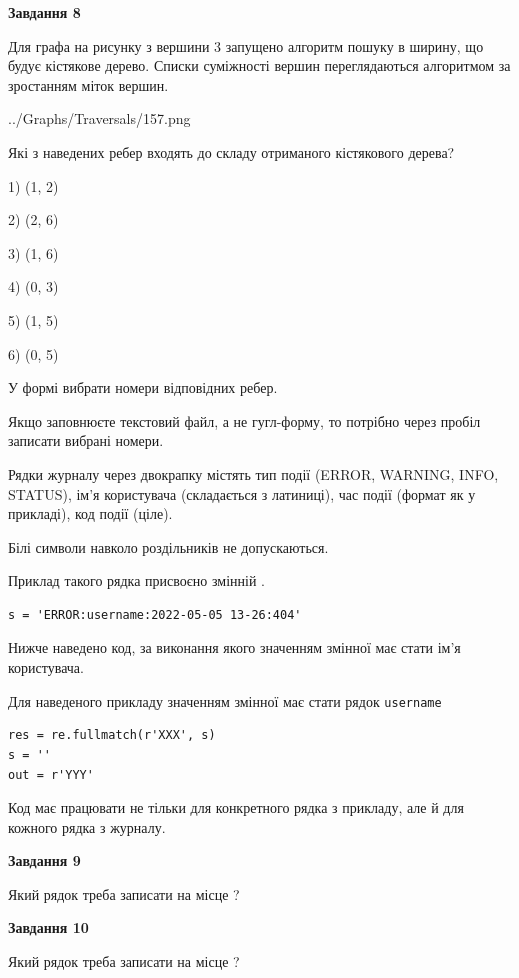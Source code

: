 \documentclass[12pt, ukrainian]{article}
\def\code#1{\Verb!#1!}
\begin{document}
{\begin {large}
{\begin {center}\textbf{Завдання 8}\end {center}}\par
Для графа на рисунку з вершини 3 запущено алгоритм пошуку в ширину, що будує кістякове дерево. Списки суміжності вершин переглядаються алгоритмом за зростанням міток вершин.\par
\begin{center}
	{../Graphs/Traversals/157.png}
\end{center}
\par Які з наведених ребер входять до складу отриманого кістякового дерева?\par
1) (1, 2)\par
2) (2, 6)\par
3) (1, 6)\par
4) (0, 3)\par
5) (1, 5)\par
6) (0, 5)\par
{\vskip 15pt} У формі вибрати номери відповідних ребер.


Якщо заповнюєте текстовий файл, а не гугл-форму, то потрібно через пробіл записа\-ти вибрані номери.\par
\newpage


Рядки журналу через двокрапку містять тип події (ERROR, WARNING, INFO, STATUS), ім'я користувача (складається з латиниці), час події (фор\-мат як у прикладі), код події (ціле).

Білі символи навколо роздільників не допускаються.

Приклад такого рядка присвоєно змінній .



\begin{verbatim}
s = 'ERROR:username:2022-05-05 13-26:404'
\end{verbatim}


Нижче наведено код, за виконання якого значенням змінної  має стати ім'я користувача.

Для наведеного прикладу значенням змінної  має стати рядок \code{username}



\begin{verbatim}
res = re.fullmatch(r'XXX', s)
s = ''
out = r'YYY'
\end{verbatim}


Код має працювати не тільки для конкретного рядка з прикладу, але й для кожного рядка з журналу.

{\begin {center}\textbf{Завдання 9}\end {center}}\par
Який рядок треба записати на місце  ?\par
\vspace{5mm}


{\begin {center}\textbf{Завдання 10}\end {center}}\par
Який рядок треба записати на місце  ?\par


\newpage


\end {large}}
\end{document}
